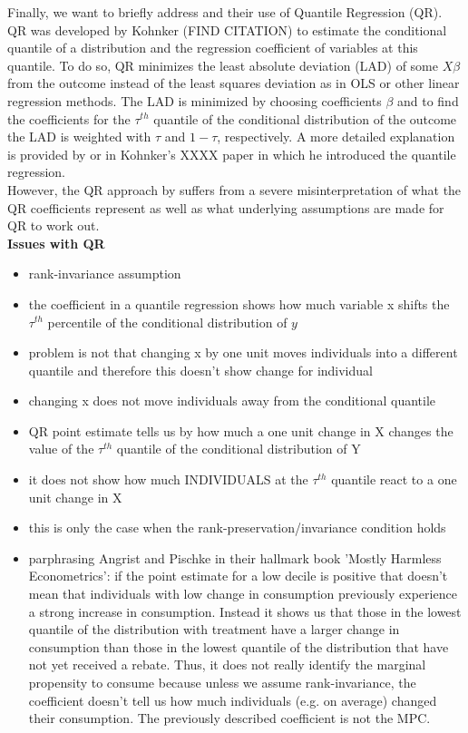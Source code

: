 Finally, we want to briefly address \cite{ms_14} and their use of Quantile Regression (QR). QR was developed by Kohnker (FIND CITATION) to estimate the conditional quantile of a distribution and the regression coefficient of variables at this quantile. To do so, QR minimizes the least absolute deviation (LAD) of some $X\beta$ from the outcome instead of the least squares deviation as in OLS or other linear regression methods. The LAD is minimized by choosing coefficients $\beta$ and to find the coefficients for the $\tau^{th}$ quantile of the conditional distribution of the outcome the LAD is weighted with $\tau$ and $1-\tau$, respectively. A more detailed explanation is provided by \cite{ms_14} or in Kohnker's XXXX paper in which he introduced the quantile regression. \\
However, the QR approach by \cite{ms_14} suffers from a severe misinterpretation of what the QR coefficients represent as well as what underlying assumptions are made for QR to work out. \\
\textbf{Issues with QR}
\begin{itemize}
    \item rank-invariance assumption
    \item the coefficient in a quantile regression shows how much variable x shifts the $\tau^{th}$ percentile of the conditional distribution of $y$
    \item problem is not that changing x by one unit moves individuals into a different quantile and therefore this doesn't show change for individual 
    \item changing x does not move individuals away from the conditional quantile 
    \item QR point estimate tells us by how much a one unit change in X changes the value of the $\tau^{th}$ quantile of the conditional distribution of Y 
    \item it does not show how much INDIVIDUALS at the $\tau^{th}$ quantile react to a one unit change in X
    \item this is only the case when the rank-preservation/invariance condition holds 
    \item parphrasing Angrist and Pischke in their hallmark book 'Mostly Harmless Econometrics': if the point estimate for a low decile is positive that doesn't mean that individuals with low change in consumption previously experience a strong increase in consumption. Instead it shows us that those in the lowest quantile of the distribution with treatment have a larger change in consumption than those in the lowest quantile of the distribution that have not yet received a rebate. Thus, it does not really identify the marginal propensity to consume because unless we assume rank-invariance, the coefficient doesn't tell us how much individuals (e.g. on average) changed their consumption. The previously described coefficient is not the MPC.
\end{itemize}



